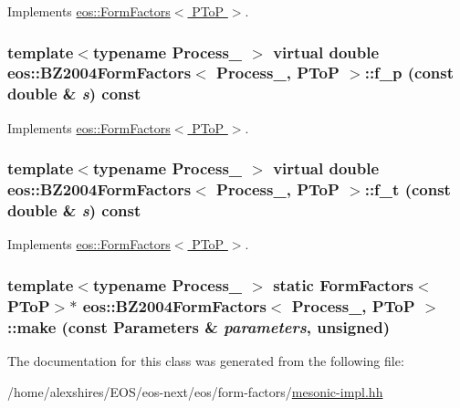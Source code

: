 Implements \hyperlink{classeos_1_1FormFactors_3_01PToP_01_4_a097a12cde6acb9004d1a92cbb8e60734}{eos::FormFactors$<$ PToP $>$}.\hypertarget{classeos_1_1BZ2004FormFactors_3_01Process___00_01PToP_01_4_aa8cda87a04cbfced508534de89f95e7d}{
\subsubsection[{f\_\-p}]{\setlength{\rightskip}{0pt plus 5cm}template$<$typename Process\_\- $>$ virtual double eos::BZ2004FormFactors$<$ Process\_\-, {\bf PToP} $>$::f\_\-p (const double \& {\em s}) const}}
\label{classeos_1_1BZ2004FormFactors_3_01Process___00_01PToP_01_4_aa8cda87a04cbfced508534de89f95e7d}


Implements \hyperlink{classeos_1_1FormFactors_3_01PToP_01_4_a987757eb4559de496005ed2730e78a10}{eos::FormFactors$<$ PToP $>$}.\hypertarget{classeos_1_1BZ2004FormFactors_3_01Process___00_01PToP_01_4_a1721a47e9e515d8301e0611cb82398aa}{
\subsubsection[{f\_\-t}]{\setlength{\rightskip}{0pt plus 5cm}template$<$typename Process\_\- $>$ virtual double eos::BZ2004FormFactors$<$ Process\_\-, {\bf PToP} $>$::f\_\-t (const double \& {\em s}) const}}
\label{classeos_1_1BZ2004FormFactors_3_01Process___00_01PToP_01_4_a1721a47e9e515d8301e0611cb82398aa}


Implements \hyperlink{classeos_1_1FormFactors_3_01PToP_01_4_ae753d67d42936bd32b043838e7fb769a}{eos::FormFactors$<$ PToP $>$}.\hypertarget{classeos_1_1BZ2004FormFactors_3_01Process___00_01PToP_01_4_a8840441ed8292da6d6728cea0ac2692e}{
\subsubsection[{make}]{\setlength{\rightskip}{0pt plus 5cm}template$<$typename Process\_\- $>$ static FormFactors$<${\bf PToP}$>$$\ast$ eos::BZ2004FormFactors$<$ Process\_\-, {\bf PToP} $>$::make (const {\bf Parameters} \& {\em parameters}, \/  unsigned)}}
\label{classeos_1_1BZ2004FormFactors_3_01Process___00_01PToP_01_4_a8840441ed8292da6d6728cea0ac2692e}


The documentation for this class was generated from the following file:\begin{DoxyCompactItemize}
\item 
/home/alexshires/EOS/eos-\/next/eos/form-\/factors/\hyperlink{mesonic-impl_8hh}{mesonic-\/impl.hh}\end{DoxyCompactItemize}
